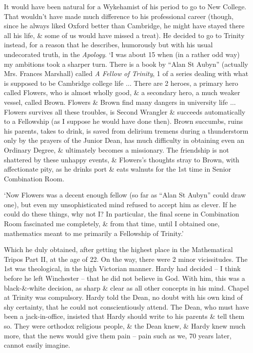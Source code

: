 \documentclass{article}
\numberwithin{equation}{section}
\begin{document}
It would have been natural for a Wykehamist of his period to go to New College. That wouldn't have made much difference to his professional career (though, since he always liked Oxford better than Cambridge, he might have stayed there all his life, \& some of us would have missed a treat). He decided to go to Trinity instead, for a reason that he describes, humorously but with his usual undecorated truth, in the \textit{Apology}. `I was about 15 when (in a rather odd way) my ambitions took a sharper turn. There is a book by ``Alan St Aubyn'' (actually Mrs. Frances Marshall) called \textit{A Fellow of Trinity}, 1 of a series dealing with what is supposed to be Cambridge college life $\ldots$ There are 2 heroes, a primary hero called Flowers, who is almost wholly good, \& a secondary hero, a much weaker vessel, called Brown. Flowers \& Brown find many dangers in university life $\ldots$ Flowers survives all these troubles, is Second Wrangler \& succeeds automatically to a Fellowship (as I suppose he would have done then). Brown succumbs, ruins his parents, takes to drink, is saved from delirium tremens during a thunderstorm only by the prayers of the Junior Dean, has much difficulty in obtaining even an Ordinary Degree, \& ultimately becomes a missionary. The friendship is not shattered by these unhappy events, \& Flowers's thoughts stray to Brown, with affectionate pity, as he drinks port \& eats walnuts for the 1st time in Senior Combination Room.

`Now Flowers was a decent enough fellow (so far as ``Alan St Aubyn'' could draw one), but even my unsophisticated mind refused to accept him as clever. If he could do these things, why not I? In particular, the final scene in Combination Room fascinated me completely, \& from that time, until I obtained one, mathematics meant to me primarily a Fellowship of Trinity.'

Which he duly obtained, after getting the highest place in the Mathematical Tripos Part II, at the age of 22. On the way, there were 2 minor vicissitudes. The 1st was theological, in the high Victorian manner. Hardy had decided -- I think before he left Winchester -- that he did not believe in God. With him, this was a black-\&-white decision, as sharp \& clear as all other concepts in his mind. Chapel at Trinity was compulsory. Hardy told the Dean, no doubt with his own kind of shy certainty, that he could not conscientiously attend. The Dean, who must have been a jack-in-office, insisted that Hardy should write to his parents \& tell them so. They were orthodox religious people, \& the Dean knew, \& Hardy knew much more, that the news would give them pain -- pain such as we, 70 years later, cannot easily imagine.
\end{document}
